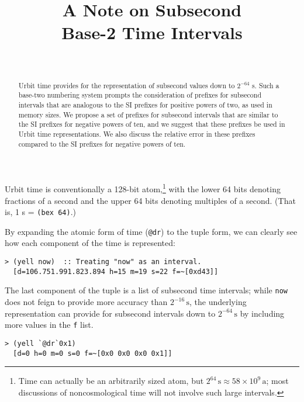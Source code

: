 \documentclass[twoside]{article}
\title{A Note on Subsecond \\ Base-2 Time Intervals}
\author{\authorname~\authorpatp \\ \affiliation}
\date{}
\begin{document}
\maketitle
\thispagestyle{firststyle}

\begin{abstract}
Urbit time provides for the representation of subsecond values down to $2^{-64}$ s.  Such a base-two numbering system prompts the consideration of prefixes for subsecond intervals that are analogous to the SI prefixes for positive powers of two, as used in memory sizes.  We propose a set of prefixes for subsecond intervals that are similar to the SI prefixes for negative powers of ten, and we suggest that these prefixes be used in Urbit time representations.  We also discuss the relative error in these prefixes compared to the SI prefixes for negative powers of ten.
\end{abstract}

\setcounter{page}{1}

Urbit time is conventionally a 128-bit atom,\footnote{Time can actually be an arbitrarily sized atom, but $2^{64} \,\textrm{s} \approx 58 \times 10^{9} \,\textrm{a}$; most discussions of noncosmological time will not involve such large intervals.} with the lower 64 bits denoting fractions of a second and the upper 64 bits denoting multiples of a second.  (That is, 1 s = \lstinline[style=inlinecode]{(bex 64)}.)

By expanding the atomic form of time (\lstinline[style=inlinecode]{@dr}) to the tuple form, we can clearly see how each component of the time is represented:

\begin{lstlisting}[style=listingcode]
  > (yell now)  :: Treating "now" as an interval.
  [d=106.751.991.823.894 h=15 m=19 s=22 f=~[0xd43]]
\end{lstlisting}

The last component of the tuple is a list of subsecond time intervals; while \lstinline[style=inlinecode]{now} does not feign to provide more accuracy than $2^{-16} \,\textrm{s}$, the underlying representation can provide for subsecond intervals down to $2^{-64} \,\textrm{s}$ by including more values in the \texttt{f} list.

\begin{lstlisting}[style=listingcode]
  > (yell `@dr`0x1)
  [d=0 h=0 m=0 s=0 f=~[0x0 0x0 0x0 0x1]]
\end{lstlisting}
\end{document}

